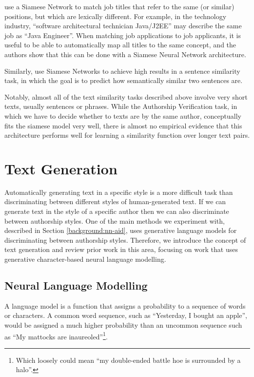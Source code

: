 \citet{neculoiu2016learning} use a Siamese Network to match job titles that refer to the same (or similar) positions, but which are lexically different. For example, in the technology industry,  ``software architectural technician Java/J2EE'' may describe the same job as ``Java Engineer''. When matching job applications to job applicants, it is useful to be able to automatically map all titles to the same concept, and the authors show that this can be done with a Siamese Neural Network architecture.

Similarly, \citet{mueller2016siamese} use Siamese Networks to achieve high results in a sentence similarity task, in which the goal is to predict how semantically similar two sentences are.

Notably, almost all of the text similarity tasks described above involve very short texts, usually sentences or phrases. While the Authorship Verification task, in which we have to decide whether to texts are by the same author, conceptually fits the siamese model very well, there is almost no empirical evidence that this architecture performs well for learning a similarity function over longer text pairs.

\section{Text Generation}
\label{background:lm}
Automatically generating text in a specific style is a more difficult task than discriminating between different styles of human-generated text. If we can generate text in the style of a specific author then we can also discriminate between authorship styles. One of the main methods we experiment with, described in Section \ref{background:nn-aid}, uses generative language models for discriminating between authorship styles. Therefore, we introduce the concept of text generation and review prior work in this area, focusing on work that uses generative character-based neural language modelling.

\subsection{Neural Language Modelling}\label{neural-networks}
A language model is a function that assigns a probability to a sequence of words or characters. A common word sequence, such as ``Yesterday, I bought an apple'', would be assigned a much higher probability than an uncommon sequence such as ``My mattocks are inaureoled''\footnote{Which loosely could mean ``my double-ended battle hoe is surrounded by a halo''.}.

